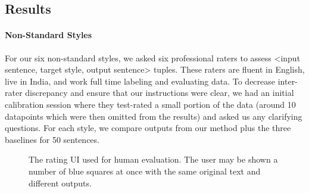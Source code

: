 \subsection{Results}
\paragraph{Non-Standard Styles}
For our six non-standard styles, we asked six professional raters to assess  <input sentence, target style, output sentence> tuples. These raters are fluent in English, live in India, and work full time labeling and evaluating data. To decrease inter-rater discrepancy and ensure that our instructions were clear, we had an initial calibration session where they test-rated a small portion of the data (around 10 datapoints which were then omitted from the results) and asked us any clarifying questions. For each style, we compare outputs from our method plus the three baselines for 50 sentences.

\begin{figure}[htb]
  \centering
  \caption{The rating UI used for human evaluation. The user may be shown a number of blue squares at once with the same original text and different outputs.}
  \label{fig:rater_ui}
\end{figure} 


